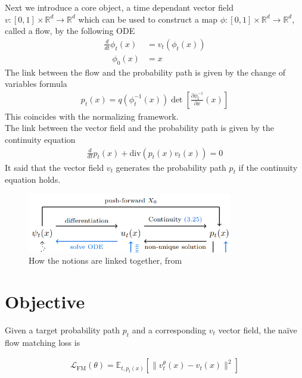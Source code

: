\documentclass[a4paper,12pt]{article}
\begin{document}
\newpage

Next we introduce a core object, a time dependant vector field \(v:[0,1]\times \mathbb{R}^d\rightarrow\mathbb{R}^d\) which can be used to construct a map \(\phi:[0,1]\times\mathbb{R}^d\rightarrow\mathbb{R}^d\), called a flow, by the following ODE
\begin{align}
    \frac{d}{dt}\phi_t(x)&=v_t(\phi_t(x))\\
    \quad \phi_0(x)&=x \nonumber
\end{align}  
The link between the flow and the probability path is given by the change of variables formula 
\begin{align}
    p_t(x)=q(\phi_t^{-1}(x))\det \left[\frac{\partial\phi_t^{-1}}{\partial x}(x)\right]
\end{align}
This coincides with the normalizing framework. \\
The link between the vector field and the probability path is given by the continuity equation 
\begin{align}
  \frac{d}{dt}p_t(x)+\text{div}(p_t(x)v_t(x))=0
\end{align}
It said that the vector field \(v_t\) generates the probability path \(p_t\) if the continuity equation holds.\\
\bigskip
\begin{figure}
    \centering
    \includegraphics[width=0.8\textwidth]{FlowMatchingBasics.png}
    \caption{How the notions are linked together, from \cite{lipman2024flowmatchingguidecode}}
    \label{fig:flow_matching_basics}
\end{figure}

\section{Objective}
Given a target probability path \(p_t\) and a corresponding \(v_t\) vector field, the naïve flow matching loss is 

\begin{align}
    \mathcal{L}_\text{FM}(\theta) = \mathbb{E}_{t,p_t(x)}\left[\|v_t^\theta(x)-v_t(x)\|^2\right]
\end{align}
\end{document}
